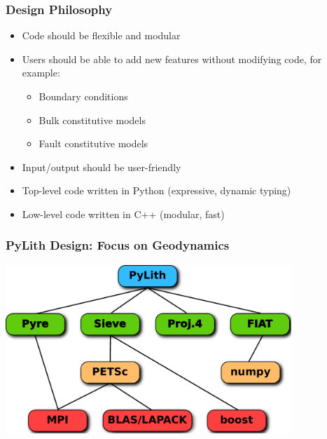 \documentclass{beamer}
\begin{document}
\begin{frame}
  \frametitle{Design Philosophy}

  \begin{itemize}
  \item Code should be flexible and modular
  \item Users should be able to add new features without modifying
    code, for example:
    \begin{itemize}
    \item Boundary conditions
    \item Bulk constitutive models
    \item Fault constitutive models
    \end{itemize}
  \item Input/output should be user-friendly
  \item Top-level code written in Python (expressive, dynamic typing)
  \item Low-level code written in C++ (modular, fast)
\end{itemize}

\end{frame}


\begin{frame}
  \frametitle{PyLith Design: Focus on Geodynamics}

  \vfill
  \begin{center}
    \includegraphics[height=2.5in]{figs/packages}
  \end{center}  
  \vfill

\end{frame}
\end{document}
